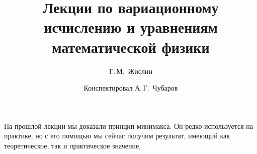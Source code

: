 \documentclass[12pt,a4paper,openany,fleqn]{book}
\newcommand{\mc}[1]{\ensuremath{\mathcal{#1}}}
\theoremstyle{definition}
\begin{document}
	\author{Г.\,М.~Жислин}
	\title{Лекции по вариационному исчислению и уравнениям математической физики}
	\date{Конспектировал А.\,Г.~Чубаров}
	
	
	
	\maketitle
	
	
	\renewcommand{\thepart}{\Asbuk{part}}
	\renewcommand{\thechapter}{\arabic{chapter}}
	\renewcommand{\thesection}{\arabic{section}}
	\renewcommand{\thesubsection}{\Roman{subsection}}
	\renewcommand{\thefootnote}{\roman{footnote}}
	\renewcommand{\phi}{\varphi}
	\renewcommand{\Re}{\ensuremath{\mc{R}e\,}}
	\renewcommand{\Im}{\ensuremath{\mc{I}m\,}}
	
	\setcounter{chapter}{5}
	\chapter{}
	\label{lecture6}
	На прошлой лекции мы доказали принцип минимакса. Он редко используется на практике, но с его помощью мы сейчас получим результат, имеющий как теоретическое, так и практическое значение.
\end{document}

